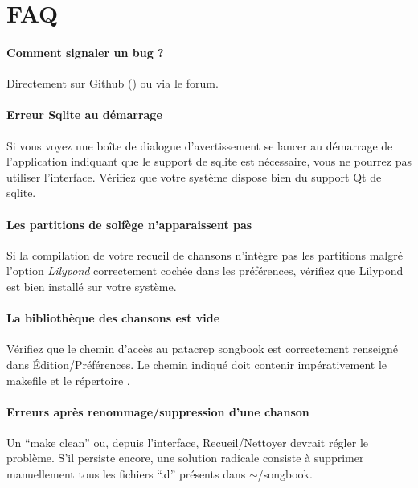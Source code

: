 \todo

\section{FAQ}

\paragraph{Comment signaler un bug ?}
Directement sur Github () ou via le forum.

\paragraph{Erreur Sqlite au démarrage} 
Si vous voyez une boîte de dialogue d'avertissement se lancer au
démarrage de l'application indiquant que le support de sqlite est
nécessaire, vous ne pourrez pas utiliser l'interface. Vérifiez que
votre système dispose bien du support Qt de sqlite.

\paragraph{Les partitions de solfège n'apparaissent pas}
Si la compilation de votre recueil de chansons n'intègre pas les
partitions malgré l'option \emph{Lilypond} correctement cochée dans les
préférences, vérifiez que Lilypond est bien installé sur votre système. 

\paragraph{La bibliothèque des chansons est vide} 
Vérifiez que le chemin d'accès au patacrep songbook est correctement
renseigné dans Édition/Préférences.  Le chemin indiqué doit contenir
impérativement le makefile et le répertoire .

\paragraph{Erreurs après renommage/suppression d'une chanson} 
Un ``make clean'' ou, depuis l'interface, Recueil/Nettoyer devrait
régler le problème. S'il persiste encore, une solution radicale
consiste à supprimer manuellement tous les fichiers ``.d'' présents
dans $\sim$/songbook.

